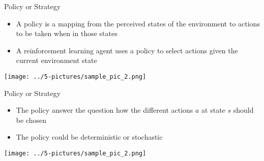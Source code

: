 \documentclass[11pt]{beamer}
\begin{document}
\begin{frame}{Policy or Strategy}
	\begin{itemize}
		\item A policy is a mapping from the perceived states of the environment to actions to be taken when in those states
		\item A reinforcement learning agent uses a policy to select actions given the current environment state
	\end{itemize}
	\begin{center}
	\texttt{[image: ../5-pictures/sample\_pic\_2.png]}
	\end{center}
\end{frame}
\begin{frame}{Policy or Strategy}
	\begin{itemize}
		\item The policy answer the question how the different actions $a$ at state $s$ should be chosen
		\item The policy could be deterministic or stochastic
	\end{itemize}
	\begin{center}
	\texttt{[image: ../5-pictures/sample\_pic\_2.png]}
	\end{center}
\end{frame}
\end{document}
